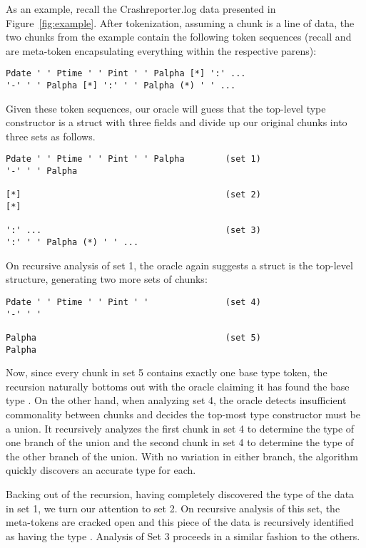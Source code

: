 As an example, recall the Crashreporter.log data presented in
Figure~\ref{fig:example}.  After tokenization, assuming a chunk is
a line of data, the two chunks from the example contain the following 
token sequences (recall \cd{[*]} and \cd{(*)} are meta-token encapsulating
everything within the respective parens):
{\small
\begin{verbatim}
Pdate ' ' Ptime ' ' Pint ' ' Palpha [*] ':' ...
'-' ' ' Palpha [*] ':' ' ' Palpha (*) ' ' ...
\end{verbatim}
}
\noindent
Given these token sequences, 
our oracle will guess that the top-level type constructor is a struct 
with three fields and divide up our original chunks into three sets
as follows.
{\small
\begin{verbatim}
Pdate ' ' Ptime ' ' Pint ' ' Palpha        (set 1)       
'-' ' ' Palpha 

[*]                                        (set 2)       
[*]

':' ...                                    (set 3)       
':' ' ' Palpha (*) ' ' ...
\end{verbatim}
}
\noindent
On recursive analysis of set 1, the oracle again suggests a struct is the top-level structure,
generating two more sets of chunks: 
{\small
\begin{verbatim}
Pdate ' ' Ptime ' ' Pint ' '               (set 4)       
'-' ' '

Palpha                                     (set 5)       
Palpha 
\end{verbatim}
}
\noindent
Now, since every chunk in set 5 contains exactly one base type
token, the recursion naturally bottoms out with the oracle claiming it has
found the base type .  On the other hand, when analyzing set 4, 
the oracle detects insufficient commonality between chunks and decides
the top-most type constructor must be a union. It recursively analyzes 
the first chunk in set 4 to determine the type of one 
branch of the union and the second chunk in set 4 to determine the type of
the other branch of the union.  With no variation in either branch,
the algorithm quickly discovers an accurate type for each.

Backing out of the recursion, having completely discovered the
type of the data in set 1, we turn our attention to set 2.
On recursive analysis of this set, the meta-tokens are cracked open
and this piece of the data is recursively identified as having the type 
.  Analysis of Set 3 proceeds in a similar 
fashion to the others.

